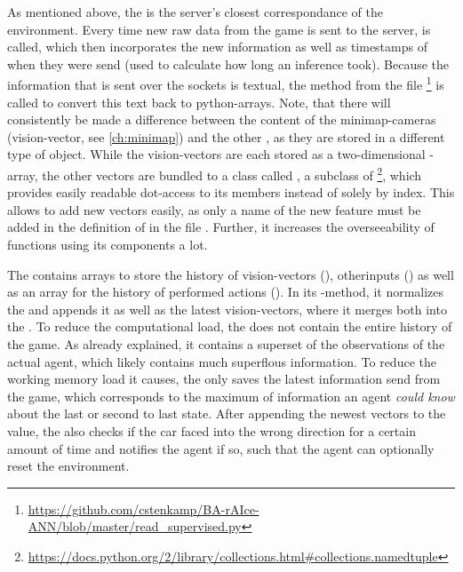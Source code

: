 As mentioned above, the  is the server's closest correspondance of the environment. Every time new raw data from the game is sent to the server,  is called, which then incorporates the new information as well as timestamps of when they were send (used to calculate how long an inference took). Because the information that is sent over the sockets is textual, the method  from the file \footnote{\url{https://github.com/cstenkamp/BA-rAIce-ANN/blob/master/read_supervised.py}} is called to convert this text back to python-arrays. Note, that there will consistently be made a difference between the content of the minimap-cameras (vision-vector, see \ref{ch:minimap}) and the other , as they are stored in a different type of object. While the vision-vectors are each stored as a two-dimensional -array, the other vectors are bundled to a class called , a subclass of  \footnote{\url{https://docs.python.org/2/library/collections.html#collections.namedtuple}}, which provides easily readable dot-access to its members instead of solely by index. This allows to add new vectors easily, as only a name of the new feature must be added in the definition of  in the file . Further, it increases the overseeability of functions using its components a lot.

The  contains arrays to store the history of vision-vectors (), otherinputs () as well as an array for the history of performed actions (). In its -method, it normalizes the  and appends it as well as the latest vision-vectors, where it merges both into the .
To reduce the computational load, the  does not contain the entire history of the game. As already explained, it contains a superset of the observations of the actual agent, which likely contains much superflous information. To reduce the working memory load it causes, the  only saves the latest information send from the game, which corresponds to the maximum of information an agent \textit{could know} about the last or second to last state. After appending the newest vectors to the value, the  also checks if the car faced into the wrong direction for a certain amount of time and notifies the agent if so, such that the agent can optionally reset the environment.

